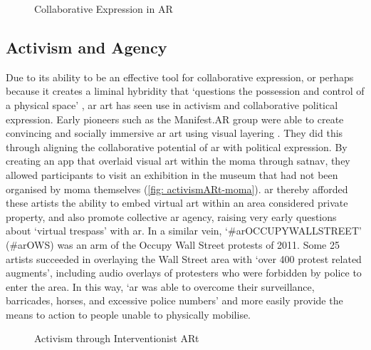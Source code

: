 \begin{figure}[ht]
    \centering
    \captionsetup{justification=centering}
    \hfill
    \caption{Collaborative Expression in AR}
    \label{fig: collaborativeARt}
\end{figure}

\subsection{Activism and Agency}\label{sec: ar-arts-activism}
Due to its ability to be an effective tool for collaborative expression, or perhaps because it creates a liminal hybridity that `questions the possession and control of a physical space' \citep{thiel2018}, \gls{ar} art has seen use in activism and collaborative political expression. Early pioneers such as the Manifest.AR group were able to create convincing and socially immersive \gls{ar} art using visual layering \citep{veenhof2010}. They did this through aligning the collaborative potential of \gls{ar} with political expression. By creating an app that overlaid visual art within the \gls{moma} through \gls{satnav}, they allowed participants to visit an exhibition in the museum that had not been organised by \gls{moma} themselves (\autoref{fig: activismARt-moma}). \gls{ar} thereby afforded these artists the ability to embed virtual art within an area considered private property, and also promote collective \gls{ar} agency, raising very early questions about `virtual trespass' with \gls{ar}. In a similar vein, `\#arOCCUPYWALLSTREET' (\#arOWS) was an arm of the Occupy Wall Street protests of 2011. Some 25 artists succeeded in overlaying the Wall Street area with `over 400 protest related augments', including audio overlays of protesters who were forbidden by police to enter the area. In this way, `\gls{ar} was able to overcome their surveillance, barricades, horses, and excessive police numbers' \citep{skwarek2018} and more easily provide the means to action to people unable to physically mobilise.

\begin{figure}
    \centering
    \captionsetup{justification=centering}
    \hfill
    \caption{Activism through Interventionist ARt}
    \label{fig: activismARt}
\end{figure}

